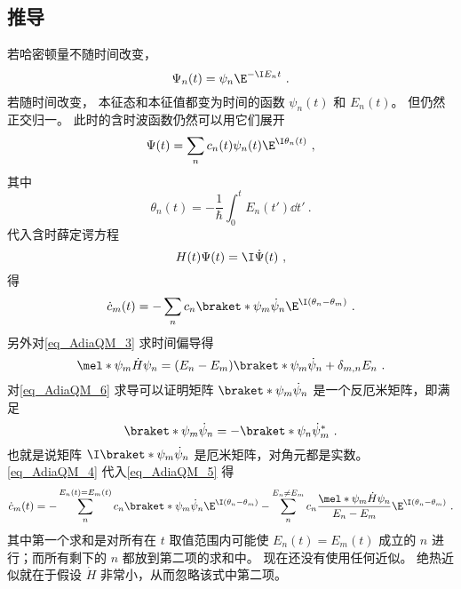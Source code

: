 \subsection{推导}
若哈密顿量不随时间改变，
\begin{equation}
\Psi_n(t) = \psi_n \E^{-\I E_n t}~.
\end{equation}
若随时间改变， 本征态和本征值都变为时间的函数 $\psi_n(t)$ 和 $E_n(t)$。 但仍然正交归一。 此时的含时波函数仍然可以用它们展开
\begin{equation}
\Psi(t) = \sum_n c_n(t) \psi_n(t) \E^{\I \theta_n(t)}~,
\end{equation}
其中
\begin{equation}
\theta_n(t) = -\frac{1}{\hbar} \int_0^t E_n(t')\dd{t'}~.
\end{equation}
代入含时薛定谔方程
\begin{equation}\label{eq_AdiaQM_1}
H(t)\Psi(t) = \I \dot \Psi(t)~,
\end{equation}
得
\begin{equation}\label{eq_AdiaQM_5}
\dot c_m(t) = -\sum_n c_n \braket*{\psi_m}{\dot\psi_n}\E^{\I(\theta_n-\theta_m)}~.
\end{equation}
另外对\autoref{eq_AdiaQM_3} 求时间偏导得
\begin{equation}\label{eq_AdiaQM_4}
\mel*{\psi_m}{\dot H}{\psi_n} = (E_n-E_m)\braket*{\psi_m}{\dot\psi_n} + \delta_{m,n}E_n~.
\end{equation}
对\autoref{eq_AdiaQM_6} 求导可以证明矩阵 $\braket*{\psi_m}{\dot\psi_n}$ 是一个反厄米矩阵，即满足
\begin{equation}\label{eq_AdiaQM_7}
\braket*{\psi_m}{\dot\psi_n} = -\braket*{\psi_n}{\dot\psi_m}^*~.
\end{equation}
也就是说矩阵 $\I\braket*{\psi_m}{\dot\psi_n}$ 是厄米矩阵，对角元都是实数。
\autoref{eq_AdiaQM_4} 代入\autoref{eq_AdiaQM_5} 得
\begin{equation}\label{eq_AdiaQM_8}
\dot c_m(t) = - \sum_{n}^{E_n(t)=E_m(t)} c_n \braket*{\psi_m}{\dot\psi_n}\E^{\I(\theta_n-\theta_m)}
- \sum_{n}^{E_n\ne E_m} c_n \frac{\mel*{\psi_m}{\dot H}{\psi_n}}{E_n-E_m}\E^{\I(\theta_n-\theta_m)}~.
\end{equation}
其中第一个求和是对所有在 $t$ 取值范围内可能使 $E_n(t)=E_m(t)$ 成立的 $n$ 进行；而所有剩下的 $n$ 都放到第二项的求和中。 现在还没有使用任何近似。 绝热近似就在于假设 $\dot H$ 非常小，从而忽略该式中第二项。


